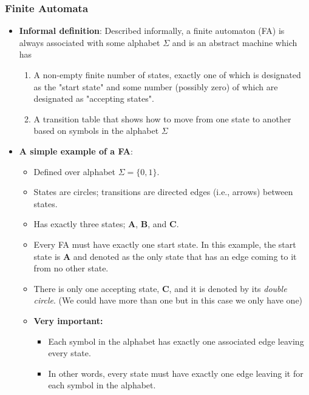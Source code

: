 \documentclass{report}
\begin{document}
    \subsubsection{Finite Automata}
    \begin{itemize}
        \item \textbf{Informal definition}: Described informally, a finite automaton (FA) is always associated with some alphabet $\Sigma$ and is an abstract machine which has 
            \begin{enumerate}
                \item A non-empty finite number of states, exactly one of which is designated as the "start state" and some number (possibly zero) of which are designated as "accepting states".
                \item A transition table that shows how to move from one state to another based on symbols in the alphabet $\Sigma$
            \end{enumerate}
        \item \textbf{A simple example of a FA}:
            \bigbreak \noindent 
            \begin{itemize}
                \item Defined over alphabet $\Sigma = \{0, 1\}$.
                \item States are circles; transitions are directed edges (i.e., arrows) between states.
                \item Has exactly three states; \textbf{A}, \textbf{B}, and \textbf{C}.
                \item Every FA must have exactly one start state. In this example, the start state is \textbf{A} and denoted as the only state that has an edge coming to it from no other state.
                \item There is only one accepting state, \textbf{C}, and it is denoted by its \textit{double circle}. (We could have more than one but in this case we only have one)
                \item \textbf{Very important:}
                    \begin{itemize}
                        \item Each symbol in the alphabet has exactly one associated edge leaving every state.
                        \item In other words, every state must have exactly one edge leaving it for each symbol in the alphabet.
                    \end{itemize}

\end{itemize}
\end{itemize}
\end{document}
